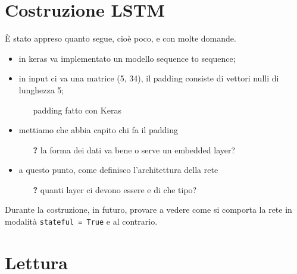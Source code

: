 \documentclass[twoside,twocolumn]{article}
\theoremstyle{definition}
\begin{document}
\section{Costruzione LSTM}
	È stato appreso quanto segue, cioè poco, e con molte domande.
	\begin{itemize}
		\item in keras va implementato un modello sequence to sequence;
		\item in input ci va una matrice (5, 34), il padding consiste di vettori nulli di lunghezza 5;
		\begin{itemize}
			\item[\textbf{\checkmark}] padding fatto con Keras
		\end{itemize}
		\item mettiamo che abbia capito chi fa il padding
		\begin{itemize}
			\item[\textbf{?}] la forma dei dati va bene o serve un embedded layer?
		\end{itemize}
		\item a questo punto, come definisco l'architettura della rete
		\begin{itemize}
			\item[\textbf{?}] quanti layer ci devono essere e di che tipo?
		\end{itemize}
	\end{itemize}
	Durante la costruzione, in futuro, provare a vedere come si comporta la rete in modalità \texttt{stateful = True} e al contrario.

\section{Lettura \cite{bib:fenomeni-prosodici-prominenza}}
\end{document}

